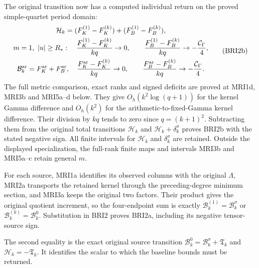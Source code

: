 \documentclass[11pt,a4paper]{article}
\begin{document}
The original transition now has a computed individual return
on the proved simple-quartet period domain:
\[
\begin{gathered}
 \mathcal H_k=(F_K^{(1)}-F_K^{(k)})+(F_B^{(1)}-F_B^{(k)}),\\
 m=1,\ |u|\ge R_*:\quad
 \frac{F_K^{(1)}-F_K^{(k)}}{kq}\to0,\qquad
 \frac{F_B^{(1)}-F_B^{(k)}}{kq}\to-\frac{\mathcal C_\Gamma}{4},\\
 \mathcal B_k^{\rm ar}=F_K^{\rm ar}+F_B^{\rm ar},\quad
 \frac{F_K^{\rm ar}-F_K^{(k)}}{kq}\to0,\qquad
 \frac{F_B^{\rm ar}-F_B^{(k)}}{kq}\to-\frac{\mathcal C_\Gamma}{4}.
\end{gathered}\tag{BRI2b}
\]
The full metric comparison, exact ranks and signed deficits
are proved at MRI1d, MRI3b and MRI5a--d below. They give
$O_h(k^2\log(q+1))$ for the kernel Gamma difference and
$O_h(k^2)$ for the arithmetic-to-fixed-Gamma kernel difference.
Their division by $kq$ tends to zero since $q=(k+1)^2$.
Subtracting them from the original total transitions
$\mathcal H_k$ and $\mathcal H_k+\delta_k^\sigma$ proves
BRI2b with the stated negative sign. All finite intervals
for $\mathcal H_k$ and $\delta_k^\sigma$ are retained.
Outside the displayed specialization, the full-rank finite
maps and intervals MRI3b and MRI5a--c retain general $m$.

For each source, MRI1a identifies its observed columns with
the original $\Lambda$, MRI2a transports the retained kernel
through the preceding-degree minimum section, and MRI3a keeps
the original two factors. Their product gives the original
quotient increment, so the four-endpoint sum is exactly
$\mathcal B_k^{(1)}=\mathcal B_k^\sigma$ or
$\mathcal B_k^{(k)}=\mathcal B_k^0$. Substitution in BRI2
proves BRI2a, including its negative tensor-source sign.

The second equality is the exact original source transition
$\mathcal B_k^0=\mathcal B_k^\sigma+\mathfrak T_k$ and
$\mathcal H_k=-\mathfrak T_k$. It identifies the scalar to
which the baseline bounds must be returned.
\end{document}
